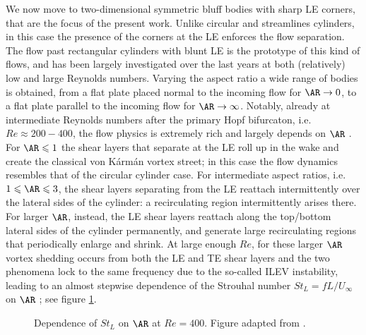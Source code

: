 We now move to two-dimensional symmetric bluff bodies with sharp LE corners, that are the focus of the present work. Unlike circular and streamlines cylinders, in this case the presence of the corners at the LE enforces the flow separation. The flow past rectangular cylinders with blunt LE is the prototype of this kind of flows, and has been largely investigated over the last years at both (relatively) low \citep{hourigan-thompson-tan-2001,zhang-etal-2023} and large \citep{cimarelli-leonforte-angeli-2018,chiarini-etal-2022,cimarelli-etal-2024} Reynolds numbers. Varying the aspect ratio a wide range of bodies is obtained, from a flat plate placed normal to the incoming flow for $\AR \rightarrow 0$, to a flat plate parallel to the incoming flow for $\AR \rightarrow \infty$. Notably, already at intermediate Reynolds numbers after the primary Hopf bifurcaton, i.e. $Re \approx 200-400$, the flow physics is extremely rich and largely depends on $\AR$ \citep[see for example][]{okajima-1982,nakamura-etal-1991,mills-etal-1995}. For $\AR \le 1$ the shear layers that separate at the LE roll up in the wake and create the classical von K\'{a}rm\'{a}n vortex street; in this case the flow dynamics resembles that of the circular cylinder case. For intermediate aspect ratios, i.e. $1 \le \AR \le 3$, the shear layers separating from the LE reattach intermittently over the lateral sides of the cylinder: a recirculating region intermittently arises there. For larger $\AR$, instead, the LE shear layers reattach along the top/bottom lateral sides of the cylinder permanently, and generate large recirculating regions that periodically enlarge and shrink. At large enough $Re$, for these larger $\AR$ vortex shedding occurs from both the LE and TE shear layers and the two phenomena lock to the same frequency due to the so-called ILEV instability, leading to an almost stepwise dependence of the Strouhal number $St_L=fL/U_\infty$ on $\AR$ \citep{okajima-1982,nakamura-etal-1991,hourigan-thompson-tan-2001}; see figure \ref{fig:StLAR}. 
%
\begin{figure}
  \centering
   
   \caption{Dependence of $St_L$ on $\AR$ at $Re=400$. Figure adapted from \cite{chiarini-quadrio-auteri-2022}.}
   \label{fig:StLAR}
\end{figure}
%
